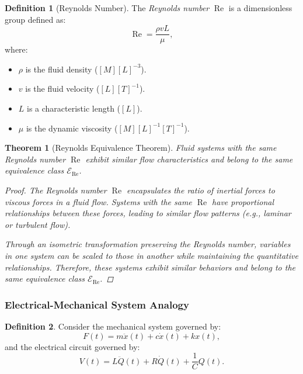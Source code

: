 \documentclass{article}
\newtheorem{theorem}{Theorem}[section]
\theoremstyle{definition}
\newtheorem{definition}{Definition}[section]
\theoremstyle{remark}
\begin{document}
	\begin{definition}[Reynolds Number]
		The \emph{Reynolds number} $\operatorname{Re}$ is a dimensionless group defined as:
		\[
		\operatorname{Re} = \dfrac{\rho v L}{\mu},
		\]
		where:
		\begin{itemize}
			\item $\rho$ is the fluid density ($[M][L]^{-3}$).
			\item $v$ is the fluid velocity ($[L][T]^{-1}$).
			\item $L$ is a characteristic length ($[L]$).
			\item $\mu$ is the dynamic viscosity ($[M][L]^{-1}[T]^{-1}$).
		\end{itemize}
	\end{definition}
	
	\begin{theorem}[Reynolds Equivalence Theorem]
		Fluid systems with the same Reynolds number $\operatorname{Re}$ exhibit similar flow characteristics and belong to the same equivalence class $\mathcal{E}_{\operatorname{Re}}$.
		
		\begin{proof}
			The Reynolds number $\operatorname{Re}$ encapsulates the ratio of inertial forces to viscous forces in a fluid flow. Systems with the same $\operatorname{Re}$ have proportional relationships between these forces, leading to similar flow patterns (e.g., laminar or turbulent flow).
			
			Through an isometric transformation preserving the Reynolds number, variables in one system can be scaled to those in another while maintaining the quantitative relationships. Therefore, these systems exhibit similar behaviors and belong to the same equivalence class $\mathcal{E}_{\operatorname{Re}}$.
		\end{proof}
	\end{theorem}
	
	\subsubsection{Electrical-Mechanical System Analogy}
	
	\begin{definition}
		Consider the mechanical system governed by:
		\[
		F(t) = m \ddot{x}(t) + c \dot{x}(t) + k x(t),
		\]
		and the electrical circuit governed by:
		\[
		V(t) = L \ddot{Q}(t) + R \dot{Q}(t) + \dfrac{1}{C} Q(t).
		\]
	\end{definition}
	
\end{document}
